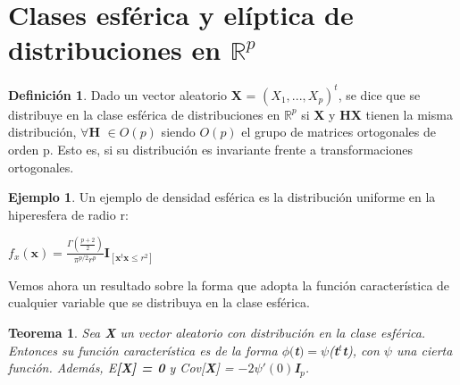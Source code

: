 \documentclass{article}
\theoremstyle{theorem-style}  %
\newtheorem{theorem}{Teorema}[section]  %
\theoremstyle{definition}
\newtheorem{definition}{Definición}[section]
\theoremstyle{example-style}
\newtheorem{example}{Ejemplo}[section]
\begin{document}
 \maketitle



\newpage
\tableofcontents
\newpage
	

\section{Clases esférica y elíptica de distribuciones en $\mathbb{R}^p$}
	
	\begin{definition}
		Dado un vector aleatorio \textbf{X} = $(X_1, ... , X_p)^t$, se dice que se distribuye en la clase esférica de distribuciones en $\mathbb{R}^p$ si \textbf{X} y \textbf{HX} tienen la misma distribución, $\forall$\textbf{H} $\in O(p)$ siendo $O(p)$ el grupo de matrices ortogonales de orden p. Esto es, si su distribución es invariante frente a transformaciones ortogonales. 
	\end{definition}

	

	\begin{example}
		Un ejemplo de densidad esférica es la distribución uniforme en la hiperesfera de radio r:
		
		\begin{center}
		\begin{math}
				f_x(\textbf{x}) = \frac{\Gamma(\frac{p+2}{2})}{\pi ^ {p/2} r^p} \textbf{I}_{[\textbf{x}^t\textbf{x} \leq r^2]}
		\end{math}
		\end{center}
	\end{example}


	Vemos ahora un resultado sobre la forma que adopta la función característica de cualquier variable que se distribuya en la clase esférica.
	
	\begin{theorem}
		Sea \textbf{X} un vector aleatorio con distribución en la clase esférica. Entonces su función característica es de la forma $\phi($\textbf{t}$) = \psi$(\textbf{t}$^t$\textbf{t}), con $\psi$ una cierta función. Además, E\textbf{[X] = 0} y Cov[\textbf{X}]  = $-2\psi'(0)$\textbf{I}$_p$.
	\end{theorem}
\end{document}
